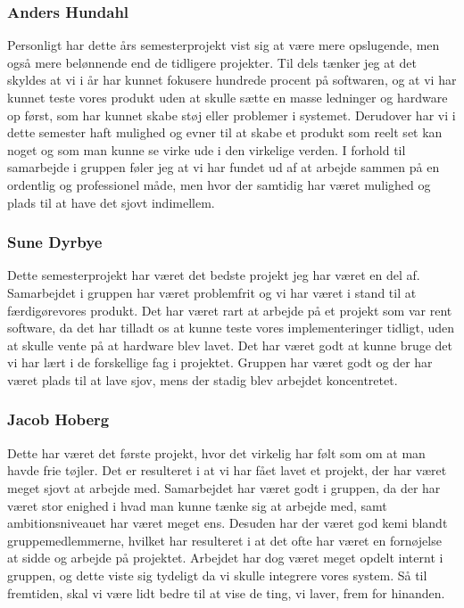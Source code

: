 \subsubsection{Anders Hundahl}
Personligt har dette års semesterprojekt vist sig at være mere opslugende, men også mere belønnende end de tidligere projekter. Til dels tænker jeg at det skyldes at vi i år har kunnet fokusere hundrede procent på softwaren, og at vi har kunnet teste vores produkt uden at skulle sætte en masse ledninger og hardware op først, som har kunnet skabe støj eller problemer i systemet. Derudover har vi i dette semester haft mulighed og evner til at skabe et produkt som reelt set kan noget og som man kunne se virke ude i den virkelige verden. I forhold til samarbejde i gruppen føler jeg at vi har fundet ud af at arbejde sammen på en ordentlig og professionel måde, men hvor der samtidig har været mulighed og plads til at have det sjovt indimellem.

\subsubsection{Sune Dyrbye}
Dette semesterprojekt har været det bedste projekt jeg har været en del af. Samarbejdet i gruppen har været problemfrit og vi har været i stand til at færdigørevores produkt. Det har været rart at arbejde på et projekt som var rent software, da det har tilladt os at kunne teste vores implementeringer tidligt, uden at skulle vente på at hardware blev lavet. Det har været godt at kunne bruge det vi har lært i de forskellige fag i projektet. Gruppen har været godt og der har været plads til at lave sjov, mens der stadig blev arbejdet koncentretet.

\subsubsection{Jacob Hoberg}
Dette har været det første projekt, hvor det virkelig har følt som om at man havde frie tøjler. Det er resulteret i at vi har fået lavet et projekt, der har været meget sjovt at arbejde med. Samarbejdet har været godt i gruppen, da der har været stor enighed i hvad man kunne tænke sig at arbejde med, samt ambitionsniveauet har været meget ens. Desuden har der været god kemi blandt gruppemedlemmerne, hvilket har resulteret i at det ofte har været en fornøjelse at sidde og arbejde på projektet. Arbejdet har dog været meget opdelt internt i gruppen, og dette viste sig tydeligt da vi skulle integrere vores system. Så til fremtiden, skal vi være lidt bedre til at vise de ting, vi laver, frem for hinanden. 